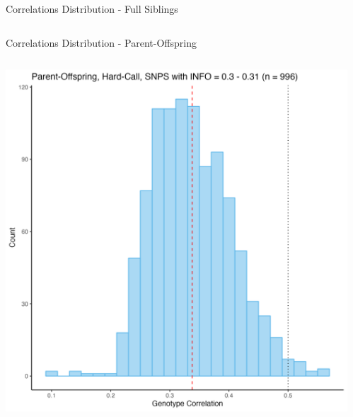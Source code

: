 \documentclass{beamer}
\begin{document}
\begin{frame}{Correlations Distribution - Full Siblings}
\begin{columns}
\begin{column}{0.5\textwidth}
            \end{column}
        \end{columns}       
\end{frame}

\begin{frame}{Correlations Distribution - Parent-Offspring}
      \begin{columns}
            \begin{column}{0.5\textwidth}
                  \centering
                  \includegraphics[width= \textwidth]{fig/PO-HC-i30.png}
              \end{column}
            \begin{column}{0.5\textwidth}
                \centering

\end{column}
\end{columns}
\end{frame}
\end{document}
